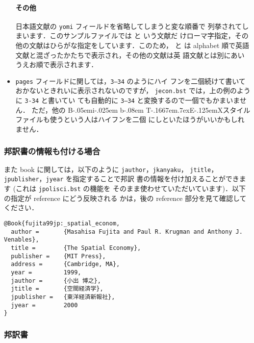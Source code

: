 \documentclass[a4j,10pt]{jarticle}
\def\BibTeX{{\rm B\kern-.05em{\sc i\kern-.025em b}\kern-.08em
    T\kern-.1667em\lower.7ex\hbox{E}\kern-.125emX}}
\begin{document}
\begin{itemize}
       \paragraph{その他}
       日本語文献の \texttt{yomi} フィールドを省略してしまうと変な順番で
       列挙されてしまいます．このサンプルファイルでは 
       \citet{nishimura90:_micr_econ} と \citet{katayama2001} いう文献だ
       けローマ字指定，その他の文献はひらがな指定をしています．このため，
       \citet{nishimura90:_micr_econ} と \citet{katayama2001} は 
       alphabet 順で英語文献と混ざったかたちで表示され，その他の文献は英
       語文献とは別にあいうえお順で表示されます．
 \item \texttt{pages} フィールドに関しては，\texttt{3--34} のようにハイ
       フンを二個続けて書いておかないときれいに表示されないのですが，
       \texttt{jecon.bst} では，上の例のように \texttt{3-34} と書いてい
       ても自動的に \texttt{3--34} と変換するので一個でもかまいません．
       ただ，他の \BibTeX スタイルファイルも使うという人はハイフンを二個
       にしといたほうがいいかもしれません．
\end{itemize}

\subsubsection{邦訳書の情報も付ける場合}

また book に関しては，以下のように \texttt{jauthor}，\texttt{jkanyaku}，
\texttt{jtitle}，\texttt{jpublisher}，\texttt{jyear} を指定することで邦訳
書の情報を付け加えることができます (これは \texttt{jpolisci.bst} の機能を
そのまま使わせていただいています)．以下の指定が reference にどう反映される
かは，後の  reference 部分を見て確認してください．\\

\begin{screen}
 \begin{verbatim}
@Book{fujita99jp:_spatial_econom,
  author =       {Masahisa Fujita and Paul R. Krugman and Anthony J. Venables},
  title =        {The Spatial Economy},
  publisher =    {MIT Press},
  address =      {Cambridge, MA},
  year =         1999,
  jauthor =      {小出 博之},
  jtitle =       {空間経済学},
  jpublisher =   {東洋経済新報社},
  jyear =        2000
}
 \end{verbatim}
\end{screen}

\subsubsection{邦訳書}
\end{document}
